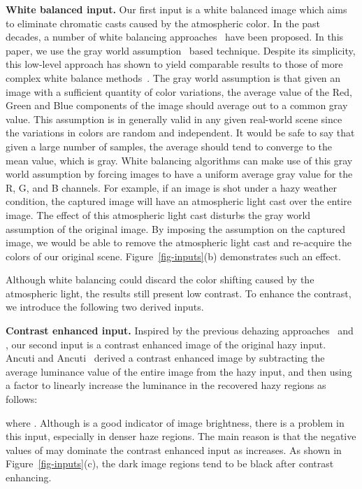 \documentclass[10pt,twocolumn,letterpaper]{article}
\begin{document}
\vspace{-2mm}
{\flushleft \textbf{White balanced input.}}
Our first input is a white balanced image which aims to eliminate chromatic casts
caused by the atmospheric color.
In the past decades, a number of white balancing approaches~\cite{kawakami2013camera}
have been proposed.
In this paper, we use the gray world assumption~\cite{reinhard2001color} based technique.
Despite its simplicity, this low-level approach has shown to
yield comparable results to those of more complex white
balance methods~\cite{li2016haze}.
The gray world assumption is that given an image with a sufficient quantity of color variations, the average value of the Red, Green and Blue components of the image should average out to a common gray value.
This assumption is in generally valid in any given real-world scene since the variations in colors are random and independent. It would be safe to say that given a large number of samples, the average should tend to converge to the mean value, which is gray.
White balancing algorithms can make use of this gray world assumption by forcing images to have a uniform average gray value for the R, G, and B channels.
For example, if an image is shot under a hazy weather condition, the captured image will have an atmospheric light  cast over the entire image. The effect of this atmospheric light cast disturbs the gray world assumption of the original image.
By imposing the assumption on the captured image, we would be able to remove the atmospheric light cast and re-acquire the colors of our original scene.
Figure~\ref{fig-inputs}(b) demonstrates such an effect.

Although white balancing could discard the color shifting caused by the atmospheric light, the results still present low contrast. To enhance the contrast, we introduce the following two derived inputs.

\vspace{-2mm}
{\flushleft \textbf{Contrast enhanced input.}}
Inspired by the previous dehazing approaches~\cite{ancuti2013single} and \cite{choi2015referenceless},
our second input is a contrast
enhanced image of the original hazy input.
Ancuti and Ancuti~\cite{ancuti2013single} derived a contrast
enhanced image by subtracting the average luminance value 
of the entire image  from the hazy input, and then using a
factor  to linearly increase the luminance in
the recovered hazy regions as follows:

where .
Although  is a good indicator of image brightness,
there is a problem in this input, especially in
denser haze regions.
The main reason is that the negative values of 
may dominate the contrast enhanced input as  increases.
As shown in Figure~\ref{fig-inputs}(c), the dark image regions tend to be black after contrast enhancing.
\end{document}
